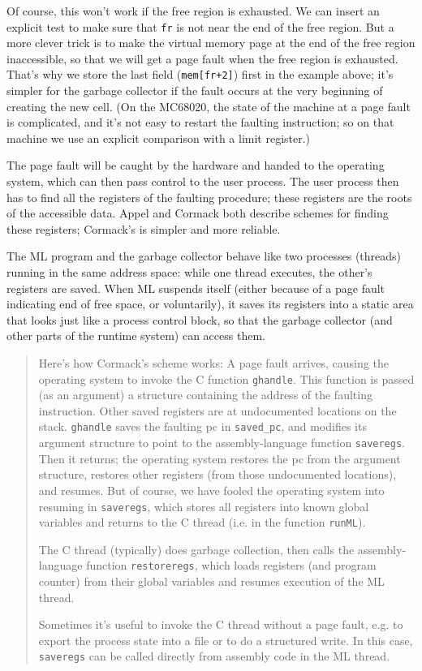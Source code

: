 Of course, this won't work if the free region is exhausted.  We can insert
an explicit test to make sure that \verb"fr" is not near the end of the
free region.  But a more clever trick is to make the virtual memory page
at the end of the free region inaccessible, so that we will get a page
fault
when the free region is exhausted.  That's why we store the
last field (\verb"mem[fr+2]") first in the example above; it's simpler
for the garbage collector if the fault occurs at the very beginning
of creating the new cell.
(On the MC68020, the state of the machine at a page fault is complicated,
and it's not easy to restart the faulting instruction; so on that machine
we use an explicit comparison with a limit register.)

The page fault will be caught by the hardware and handed to the operating
system, which can then pass control to the user process.  The user process
then has to find all the registers of the faulting procedure; these
registers are the roots of the accessible data.  Appel\cite{appel89:sggc}
and Cormack\cite{cormack88} both describe schemes for finding these
registers; Cormack's is simpler and more reliable.

The ML program and the garbage collector behave like two processes
(threads)
running in the same address space: while one thread executes, the
other's registers are saved.  When ML suspends itself (either
because of a page fault indicating end of free space, or voluntarily),
it saves its registers into a static area that looks just like a process
control block, so that the garbage collector (and other parts of the
runtime system) can access them.

\begin{quotation}
{\small Here's how Cormack's scheme works:  A page fault arrives, causing
the operating system to invoke the C function \verb"ghandle".
This function is passed (as an argument) a structure containing
the address of the faulting instruction.  Other saved registers are
at undocumented locations on the stack.  \verb"ghandle" saves the
faulting pc in \verb"saved_pc", and modifies its argument structure
to point to the assembly-language function \verb"saveregs".  Then it
returns; the operating system restores the pc from the argument
structure, restores other registers (from those undocumented locations),
and resumes.  But of course, we have fooled the operating system into
resuming in \verb"saveregs", which stores all registers into known
global variables and returns to the C thread (i.e. in the function
\verb"runML").

The C thread (typically) does garbage collection, then calls the
assembly-language function \verb"restoreregs", which loads registers
(and program counter) from their global variables and resumes execution
of the ML thread.

Sometimes it's useful to invoke the C thread without a page fault,
e.g. to export the process state into a file or to do a structured
write.  In this case, \verb"saveregs" can be called directly from assembly
code in the ML thread.
}
\end{quotation}
